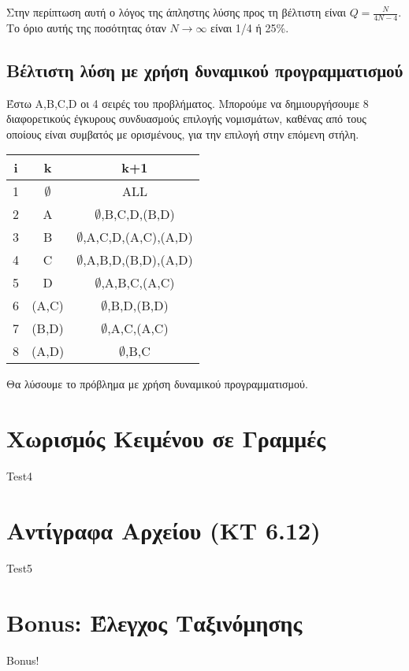 \documentclass[a4paper,11pt]{article}
\begin{document}
Στην περίπτωση αυτή ο λόγος της άπληστης λύσης προς τη βέλτιστη είναι
$Q = \frac{N}{4N-4}$. Tο όριο αυτής της ποσότητας όταν $N \to\infty$ είναι 1/4 ή
25\%.

\subsection{Βέλτιστη λύση με χρήση δυναμικού προγραμματισμού}
Έστω A,B,C,D οι 4 σειρές του προβλήματος. Μπορούμε να δημιουργήσουμε 8
διαφορετικούς έγκυρους συνδυασμούς επιλογής νομισμάτων, καθένας από τους
οποίους είναι συμβατός με ορισμένους, για την επιλογή στην επόμενη στήλη.
\begin{center}
    \begin{tabular}{ | c | c | c |}
    \hline
    i & k & k+1 \\ \hline \hline
    1 & $\emptyset$ & ALL \\ \hline
    2 & A & $\emptyset$,B,C,D,(B,D) \\ \hline
    3 & B & $\emptyset$,A,C,D,(A,C),(A,D) \\ \hline
    4 & C & $\emptyset$,A,B,D,(B,D),(A,D) \\ \hline
    5 & D & $\emptyset$,A,B,C,(A,C) \\ \hline
    6 & (A,C) & $\emptyset$,B,D,(B,D) \\ \hline
    7 & (B,D) & $\emptyset$,A,C,(A,C) \\ \hline
    8 & (A,D) & $\emptyset$,B,C \\
    \hline
    \end{tabular}
\end{center}

Θα λύσουμε το πρόβλημα με χρήση δυναμικού προγραμματισμού.




\section{Χωρισμός Κειμένου σε Γραμμές}
Test4


\section{Αντίγραφα Αρχείου (KT 6.12)}
Test5


\section{Bonus: Έλεγχος Ταξινόμησης}
Bonus!
\end{document}
